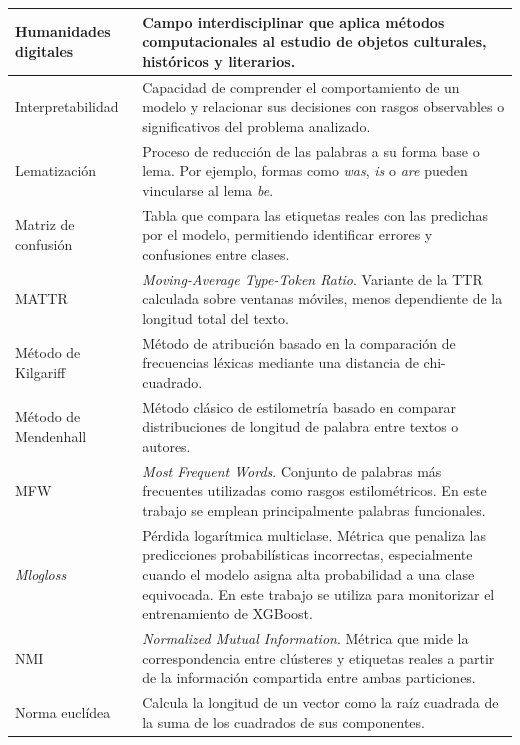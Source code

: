 \documentclass[IB]{TFUOC}%
\begin{document}
\begin{longtable}{|p{5.2cm}|p{10.5cm}|}
Humanidades digitales &
Campo interdisciplinar que aplica métodos computacionales al estudio de objetos culturales, históricos y literarios. \\
\hline

Interpretabilidad &
Capacidad de comprender el comportamiento de un modelo y relacionar sus decisiones con rasgos observables o significativos del problema analizado. \\
\hline

Lematización &
Proceso de reducción de las palabras a su forma base o lema. Por ejemplo, formas como \textit{was}, \textit{is} o \textit{are} pueden vincularse al lema \textit{be}. \\
\hline

Matriz de confusión &
Tabla que compara las etiquetas reales con las predichas por el modelo, permitiendo identificar errores y confusiones entre clases. \\
\hline

MATTR &
\textit{Moving-Average Type-Token Ratio}. Variante de la TTR calculada sobre ventanas móviles, menos dependiente de la longitud total del texto. \\
\hline

Método de Kilgariff &
Método de atribución basado en la comparación de frecuencias léxicas mediante una distancia de chi-cuadrado. \\
\hline

Método de Mendenhall &
Método clásico de estilometría basado en comparar distribuciones de longitud de palabra entre textos o autores. \\
\hline

MFW &
\textit{Most Frequent Words}. Conjunto de palabras más frecuentes utilizadas como rasgos estilométricos. En este trabajo se emplean principalmente palabras funcionales. \\
\hline

\textit{Mlogloss} &
Pérdida logarítmica multiclase. Métrica que penaliza las predicciones probabilísticas incorrectas, especialmente cuando el modelo asigna alta probabilidad a una clase equivocada. En este trabajo se utiliza para monitorizar el entrenamiento de XGBoost. \\
\hline

NMI &
\textit{Normalized Mutual Information}. Métrica que mide la correspondencia entre clústeres y etiquetas reales a partir de la información compartida entre ambas particiones. \\
\hline

Norma euclídea &
Calcula la longitud de un vector como la raíz cuadrada de la suma de los cuadrados de sus componentes. \\
\hline


\end{longtable}
\end{document}
